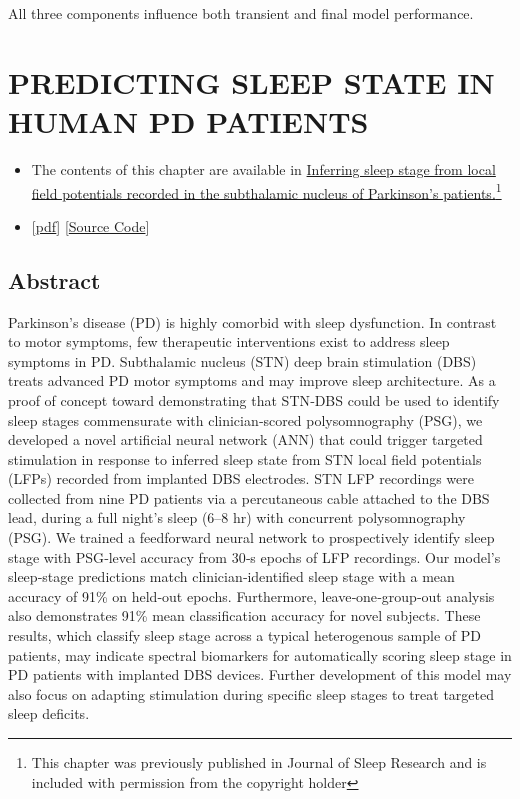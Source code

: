 \documentclass{templates/ucdenverthesis}
\begin{document}
All three components influence both transient and final model performance.

\hypertarget{ch3:jsr}{%
\chapter{PREDICTING SLEEP STATE IN HUMAN PD PATIENTS}\label{ch3:jsr}}

\begin{itemize}
\item
  The contents of this chapter are available in \href{https://doi.org/10.1111/jsr.12806}{Inferring sleep stage from local field potentials recorded in the subthalamic nucleus of Parkinson's patients.}\footnote{This chapter was previously published in \autocite{Christensen:2019ik} Journal of Sleep Research and is included with permission from the copyright holder}
\item
  {[}\href{http://www.jzlab.org/Christensen_JSleepResearch2018_LFP_ANN_DBS.pdf}{pdf}{]} {[}\href{https://github.com/jzlab/sleep_net}{Source Code}{]}
\end{itemize}

\hypertarget{abstract}{%
\section*{Abstract}\label{abstract}}

Parkinson's disease (PD) is highly comorbid with sleep dysfunction. In contrast to motor symptoms, few therapeutic interventions exist to address sleep symptoms in PD. Subthalamic nucleus (STN) deep brain stimulation (DBS) treats advanced PD motor symptoms and may improve sleep architecture. As a proof of concept toward demonstrating that STN‐DBS could be used to identify sleep stages commensurate with clinician‐scored polysomnography (PSG), we developed a novel artificial neural network (ANN) that could trigger targeted stimulation in response to inferred sleep state from STN local field potentials (LFPs) recorded from implanted DBS electrodes. STN LFP recordings were collected from nine PD patients via a percutaneous cable attached to the DBS lead, during a full night's sleep (6--8 hr) with concurrent polysomnography (PSG). We trained a feedforward neural network to prospectively identify sleep stage with PSG‐level accuracy from 30‐s epochs of LFP recordings. Our model's sleep‐stage predictions match clinician‐identified sleep stage with a mean accuracy of 91\% on held‐out epochs. Furthermore, leave‐one‐group‐out analysis also demonstrates 91\% mean classification accuracy for novel subjects. These results, which classify sleep stage across a typical heterogenous sample of PD patients, may indicate spectral biomarkers for automatically scoring sleep stage in PD patients with implanted DBS devices. Further development of this model may also focus on adapting stimulation during specific sleep stages to treat targeted sleep deficits.
\end{document}
